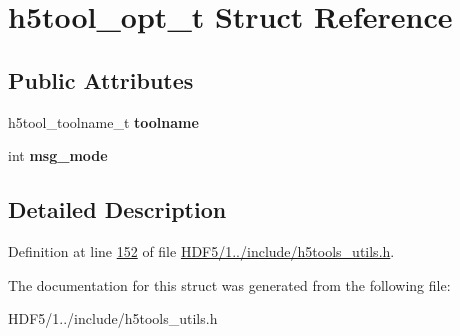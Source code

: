 \hypertarget{structh5tool__opt__t}{}\section{h5tool\+\_\+opt\+\_\+t Struct Reference}
\label{structh5tool__opt__t}
\subsection*{Public Attributes}
\begin{DoxyCompactItemize}
\item 
\mbox{\label{structh5tool__opt__t_acb92ff11a478f04974f4d674fa4ed21a}} 
h5tool\+\_\+toolname\+\_\+t {\bfseries toolname}
\item 
\mbox{\label{structh5tool__opt__t_a575a3111007345fcf96ba6fc88352bea}} 
int {\bfseries msg\+\_\+mode}
\end{DoxyCompactItemize}


\subsection{Detailed Description}


Definition at line \hyperlink{_h_d_f5_21_810_81_2include_2h5tools__utils_8h_source_l00152}{152} of file \hyperlink{_h_d_f5_21_810_81_2include_2h5tools__utils_8h_source}{H\+D\+F5/1../include/h5tools\+\_\+utils.\+h}.



The documentation for this struct was generated from the following file\+:\begin{DoxyCompactItemize}
\item 
H\+D\+F5/1../include/h5tools\+\_\+utils.\+h\end{DoxyCompactItemize}
